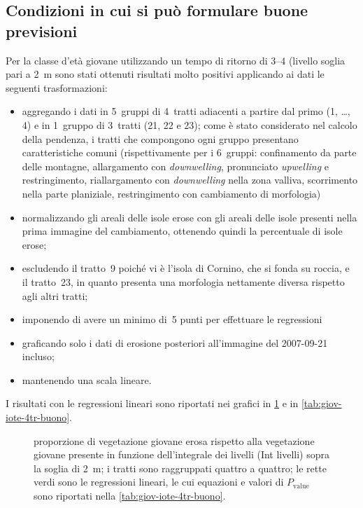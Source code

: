 \subsection{Condizioni in cui si può formulare buone previsioni}
Per la classe d'età giovane utilizzando un tempo di ritorno di \SIrange[range-phrase = {-}, range-units = single]{3}{4}{\mesi} (livello soglia pari a \SI{2}{\m} sono stati ottenuti risultati molto positivi applicando ai dati le seguenti trasformazioni:
%
\begin{itemize}
	\item aggregando i dati in 5~gruppi di 4~tratti adiacenti a partire dal primo (1, \ldots, 4) e in 1~gruppo di 3~tratti (21, 22 e 23);
		come è stato considerato nel calcolo della pendenza, i tratti che compongono ogni gruppo presentano caratteristiche comuni
		(rispettivamente per i 6~gruppi: confinamento da parte delle montagne, allargamento con \emph{downwelling}, pronunciato \emph{upwelling} e restringimento, riallargamento con \emph{downwelling} nella zona valliva, scorrimento nella parte planiziale, restringimento con cambiamento di morfologia)
	\item normalizzando gli areali delle isole erose con gli areali delle isole presenti nella prima immagine del cambiamento, ottenendo quindi la percentuale di isole erose;
	\item escludendo il tratto~9 poiché vi è l'isola di Cornino, che si fonda su roccia, e il tratto~23, in quanto presenta una morfologia nettamente diversa rispetto agli altri tratti;
	\item imponendo di avere un minimo di~5 punti per effettuare le regressioni
	\item graficando solo i dati di erosione posteriori all'immagine del 2007-09-21 incluso;
	\item mantenendo una scala lineare.
\end{itemize}
%
I risultati con le regressioni lineari sono riportati nei grafici in \cref{graph:giov-iote-4tr-buono} e in \cref{tab:giov-iote-4tr-buono}.
%
\begin{figure}
	\centering
	
	\caption[proporzione di vegetazione giovane erosa in funzione dell'integrale dei livelli sopra la soglia di \SI{2}{\m}; tratti uniti quattro a quattro]{proporzione di vegetazione giovane erosa rispetto alla vegetazione giovane presente in funzione dell'integrale dei livelli (Int livelli) sopra la soglia di \SI{2}{\m}; i tratti sono raggruppati quattro a quattro; le rette verdi sono le regressioni lineari, le cui equazioni e valori di $P_\mathrm{value}$ sono riportati nella \cref{tab:giov-iote-4tr-buono}.}
	\label{graph:giov-iote-4tr-buono}
\end{figure}
